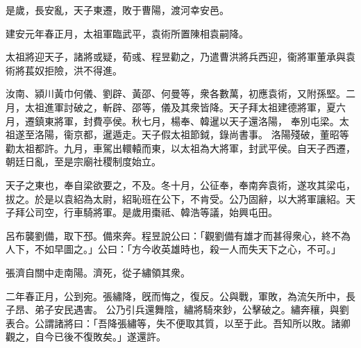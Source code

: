 \begin{pinyinscope}
是歲，長安亂，天子東遷，敗于曹陽，渡河幸安邑。


建安元年春正月，太祖軍臨武平，袁術所置陳相袁嗣降。


太祖將迎天子，諸將或疑，荀彧、程昱勸之，乃遣曹洪將兵西迎，衞將軍董承與袁術將萇奴拒險，洪不得進。


汝南、潁川黃巾何儀、劉辟、黃邵、何曼等，衆各數萬，初應袁術，又附孫堅。二月，太祖進軍討破之，斬辟、邵等，儀及其衆皆降。天子拜太祖建德將軍，夏六月，遷鎮東將軍，封費亭侯。秋七月，楊奉、韓暹以天子還洛陽，
奉別屯梁。太祖遂至洛陽，衞京都，暹遁走。天子假太祖節鉞，錄尚書事。
洛陽殘破，董昭等勸太祖都許。九月，車駕出轘轅而東，以太祖為大將軍，封武平侯。自天子西遷，朝廷日亂，至是宗廟社稷制度始立。


天子之東也，奉自梁欲要之，不及。冬十月，公征奉，奉南奔袁術，遂攻其梁屯，拔之。於是以袁紹為太尉，紹恥班在公下，不肯受。公乃固辭，以大將軍讓紹。天子拜公司空，行車騎將軍。是歲用棗祗、韓浩等議，始興屯田。


呂布襲劉備，取下邳。備來奔。程昱說公曰：「觀劉備有雄才而甚得衆心，終不為人下，不如早圖之。」公曰：「方今收英雄時也，殺一人而失天下之心，不可。」


張濟自關中走南陽。濟死，從子繡領其衆。


二年春正月，公到宛。張繡降，旣而悔之，復反。公與戰，軍敗，為流矢所中，長子昂、弟子安民遇害。
公乃引兵還舞陰，繡將騎來鈔，公擊破之。繡奔穰，與劉表合。公謂諸將曰：「吾降張繡等，失不便取其質，以至于此。吾知所以敗。諸卿觀之，自今已後不復敗矣。」遂還許。



\end{pinyinscope}
